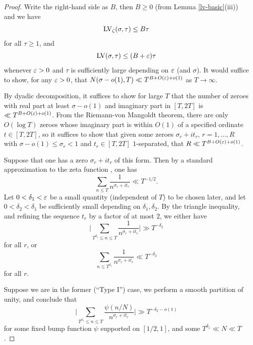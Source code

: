 \begin{proof}
Write the right-hand side as $B$, then $B \geq 0$ (from Lemma \ref{lv-basic}(iii)) and we have
\begin{equation}\label{lvz-bound}
    \mathrm{LV}_\zeta(\sigma,\tau) \leq B \tau
\end{equation}
for all $\tau \geq 1$, and
\begin{equation}\label{lv-bound}
    \mathrm{LV}(\sigma,\tau) \leq (B+\varepsilon) \tau
\end{equation}
whenever $\varepsilon>0$ and $\tau$ is sufficiently large depending on $\varepsilon$ (and $\sigma$).  It would suffice to show, for any $\varepsilon>0$, that $N(\sigma-o(1),T) \ll T^{B+O(\varepsilon)+o(1)}$ as $T \to \infty$.

By dyadic decomposition, it suffices to show for large $T$ that the number of zeroes with real part at least $\sigma-o(1)$ and imaginary part in  $[T,2T]$ is $\ll T^{B+O(\varepsilon)+o(1)}$.  From the Riemann-von Mangoldt theorem, there are only $O(\log T)$ zeroes whose imaginary part is within $O(1)$ of a specified ordinate $t \in [T,2T]$, so it suffices to show that given some zeroes $\sigma_r + i t_r$, $r=1,\dots,R$ with $\sigma-o(1) \leq \sigma_r < 1$ and $t_r \in [T,2T]$ $1$-separated, that $R \ll T^{B+O(\varepsilon)+o(1)}$.

Suppose that one has a zero $\sigma_r+i t_r$ of this form.  Then by a standard approximation to the zeta function \cite[Theorem 1.8]{ivic}, one has
$$ \sum_{n \leq T} \frac{1}{n^{\sigma_r+it_r}} \ll T^{-1/2}.$$
Let $0 < \delta_1 < \varepsilon$ be a small quantity (independent of $T$) to be chosen later, and let $0 < \delta_2 < \delta_1$ be sufficiently small depending on $\delta_1,\delta_2$.  By the triangle inequality, and refining the sequence $t_r$ by a factor of at most $2$, we either have
$$ \bigg|\sum_{T^{\delta_1} \leq n \leq T} \frac{1}{n^{\sigma_r+it_r}} \bigg| \gg T^{-\delta_2}$$
for all $r$, or
\begin{equation}\label{td}
 \sum_{n \leq T^{\delta_1}} \frac{1}{n^{\sigma_r+it_r}} \ll T^{-\delta_2}
\end{equation}
for all $r$.

Suppose we are in the former (``Type I'') case, we perform a smooth partition of unity, and conclude that
$$ \bigg|\sum_{T^{\delta_1} \leq n \leq T} \frac{\psi(n/N)}{n^{\sigma_r+it_r}} \bigg| \gg T^{-\delta_2 - o(1)}$$
for some fixed bump function $\psi$ supported on $[1/2,1]$, and some $T^{\delta_1} \ll N \ll T$.


\end{proof}
